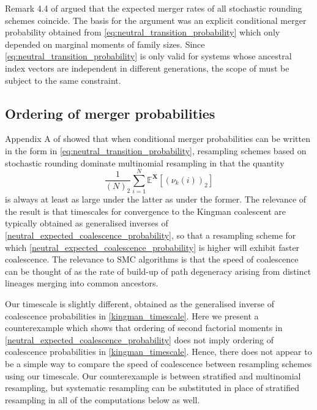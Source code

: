 \documentclass[a4paper,11pt]{article}
\theoremstyle{definition}
\newcommand{\bbE}{\mathbb{E}}
\newcommand{\bfX}{\mathbf{X}}
\begin{document}
Remark 4.4 of \cite{brownetal:2021} argued that the expected merger rates of all stochastic rounding schemes coincide.
The basis for the argument was an explicit conditional merger probability obtained from \eqref{eq:neutral_transition_probability} which only depended on marginal moments of family sizes.
Since \eqref{eq:neutral_transition_probability} is only valid for systems whose ancestral index vectors are independent in different generations, the scope of \cite[Remark 4.4]{brownetal:2021} must be subject to the same constraint.

\subsection{Ordering of merger probabilities}\label{merger_ordering}

Appendix A of \cite{brownetal:2021} showed that when conditional merger probabilities can be written in the form in \eqref{eq:neutral_transition_probability}, resampling schemes based on stochastic rounding dominate multinomial resampling in that the quantity
\begin{equation}\label{neutral_expected_coalescence_probability}
\frac{ 1 }{ ( N )_2 } \sum_{ i = 1 }^N \bbE^{ \bfX }[ ( \nu_k( i ) )_2 ]
\end{equation}
is always at least as large under the latter as under the former.
The relevance of the result is that timescales for convergence to the Kingman coalescent are typically obtained as generalised inverses of \eqref{neutral_expected_coalescence_probability}, so that a resampling scheme for which \eqref{neutral_expected_coalescence_probability} is higher will exhibit faster coalescence.
The relevance to SMC algorithms is that the speed of coalescence can be thought of as the rate of build-up of path degeneracy arising from distinct lineages merging into common ancestors.

Our timescale is slightly different, obtained as the generalised inverse of coalescence probabilities in \eqref{kingman_timescale}.
Here we present a counterexample which shows that ordering of second factorial moments in \eqref{neutral_expected_coalescence_probability} does not imply ordering of coalescence probabilities in \eqref{kingman_timescale}.
Hence, there does not appear to be a simple way to compare the speed of coalescence between resampling schemes using our timescale.
Our counterexample is between stratified and multinomial resampling, but systematic resampling can be substituted in place of stratified resampling in all of the computations below as well.
\end{document}
